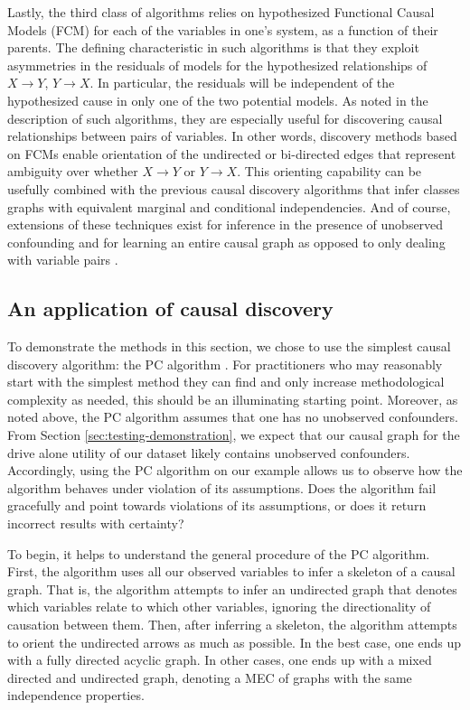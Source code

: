 Lastly, the third class of algorithms relies on hypothesized Functional Causal Models (FCM) \citep{goudet_2018_learning} for each of the variables in one's system, as a function of their parents.
The defining characteristic in such algorithms is that they exploit asymmetries in the residuals of models for the hypothesized relationships of $X \rightarrow Y$, $Y \rightarrow X$.
In particular, the residuals will be independent of the hypothesized cause in only one of the two potential models.
As noted in the description of such algorithms, they are especially useful for discovering causal relationships between pairs of variables.
In other words, discovery methods based on FCMs enable orientation of the undirected or bi-directed edges that represent ambiguity over whether $X \rightarrow Y$ or $Y \rightarrow X$.
This orienting capability can be usefully combined with the previous causal discovery algorithms that infer classes graphs with equivalent marginal and conditional independencies.
And of course, extensions of these techniques exist for inference in the presence of unobserved confounding \citep[Sec. 6]{goudet_2018_learning} and for learning an entire causal graph as opposed to only dealing with variable pairs \citep{zheng_2020_learning}.


\subsection{An application of causal discovery}
To demonstrate the methods in this section, we chose to use the simplest causal discovery algorithm: the PC algorithm \citep{glymour_2001_causation}.
For practitioners who may reasonably start with the simplest method they can find and only increase methodological complexity as needed, this should be an illuminating starting point.
Moreover, as noted above, the PC algorithm assumes that one has no unobserved confounders.
From Section \ref{sec:testing-demonstration}, we expect that our causal graph for the drive alone utility of our dataset likely contains unobserved confounders.
Accordingly, using the PC algorithm on our example allows us to observe how the algorithm behaves under violation of its assumptions.
Does the algorithm fail gracefully and point towards violations of its assumptions, or does it return incorrect results with certainty?

To begin, it helps to understand the general procedure of the PC algorithm. First, the algorithm uses all our observed variables to infer a skeleton of a causal graph.
That is, the algorithm attempts to infer an undirected graph that denotes which variables relate to which other variables, ignoring the directionality of causation between them.
Then, after inferring a skeleton, the algorithm attempts to orient the undirected arrows as much as possible.
In the best case, one ends up with a fully directed acyclic graph.
In other cases, one ends up with a mixed directed and undirected graph, denoting a MEC of graphs with the same independence properties.
